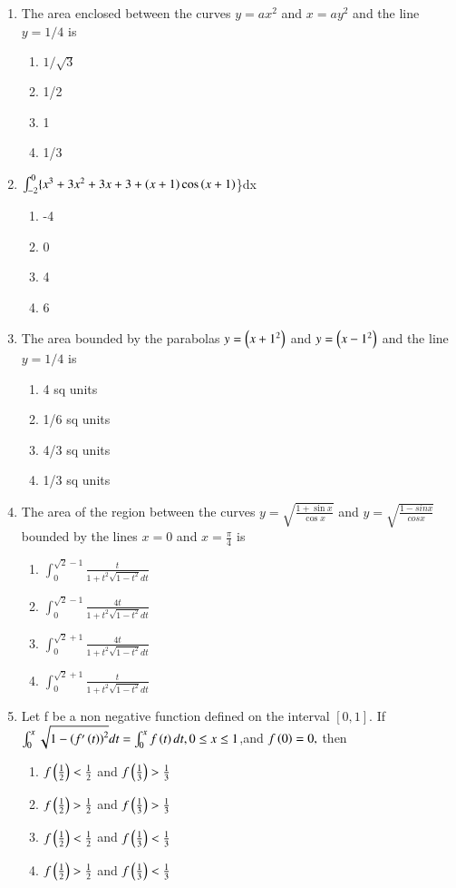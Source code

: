 \documentclass[journal,12pt,twocolumn]{IEEEtran}
\theoremstyle{remark}
\begin{document}
\begin{enumerate}
 \item The area enclosed between the curves $y=ax^{2}$ and $x=ay^{2}$ and the line $y=1/4$ is
 \begin{enumerate}
     \item $1/\sqrt{3}$
     \item 1/2
     \item 1
     \item 1/3
     \hfill{}
 \end{enumerate}
 \item $\int_{-2}^{0}\{x^{3}+3x^{2}+3x+3+\left(x+1\right)\cos\left(x+1\right)$\}dx
\begin{enumerate}
 \item -4
 \item 0
 \item 4
 \item 6
 \hfill{}
\end{enumerate}
  \item The area bounded by the parabolas $y=\left(x+1^{2}\right)$ and $y=\left(x-1^{2}\right)$ and the line $y=1/4$ is
\begin{enumerate}
    \item 4 sq units
    \item 1/6 sq units
    \item 4/3 sq units
    \item 1/3 sq units
    \hfill{}
\end{enumerate}
 \item The area of the region between the curves $y=\sqrt{\frac{1+\sin x}{\cos x}}$ and $y=\sqrt{\frac{1-sin x}{cos x}}$ bounded by the lines $x=0$ and $x=\frac{\pi}{4}$ is
\begin{enumerate}
    \item $\int_{0}^{\sqrt{2}-1}\frac{t}{1+t^{2}\sqrt{1-t^{2}}dt}$
       \item $\int_{0}^{\sqrt{2}-1}\frac{4t}{1+t^{2}\sqrt{1-t^{2}}dt}$
      \item $\int_{0}^{\sqrt{2}+1}\frac{4t}{1+t^{2}\sqrt{1-t^{2}}dt}$ 
         \item $\int_{0}^{\sqrt{2}+1}\frac{t}{1+t^{2}\sqrt{1-t^{2}}dt}$
         \hfill{}
\end{enumerate}
\item Let f be a non negative function defined on the interval $[0,1]$. If $\int_{0}^{x}\sqrt{1-\left(f'\left(t\right)\right)^{2}}dt=\int_{0}^{x}f\left(t\right)dt,0\leq{x}\leq1$,and $f\left(0\right)=0,$ then
\begin{enumerate}
    \item$ f\left(\frac{1}{2}\right)<\frac{1}{2}$ and $f\left(\frac{1}{3}\right)>\frac{1}{3}$
    \item$ f\left(\frac{1}{2}\right)>\frac{1}{2}$ and $f\left(\frac{1}{3}\right)>\frac{1}{3}$
  \item$ f\left(\frac{1}{2}\right)<\frac{1}{2}$ and $f\left(\frac{1}{3}\right)<\frac{1}{3}$
  \item$ f\left(\frac{1}{2}\right)>\frac{1}{2}$ and $f\left(\frac{1}{3}\right)<\frac{1}{3}$
  \hfill{}
\end{enumerate}
\end{enumerate}
\end{document}
